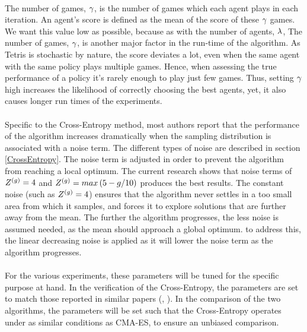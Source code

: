 \\
The number of games, $\gamma$, 
is the number of games  which each agent 
plays in each iteration. An agent's score is defined as the 
mean of the score of these 
$\gamma$ games.
We want this value low as possible, because as with the number of
agents, $\lambda$, The number of games, $\gamma$, 
is another major factor in the run-time of the algorithm.
As Tetris is stochastic by nature, the score deviates a lot, 
even when the
same agent with the same policy plays multiple games. 
Hence, when assessing the true
performance of a policy it's rarely enough to play just few games. Thus, setting 
$\gamma$ high increases the likelihood of correctly choosing the best 
agents, yet, it also causes longer run times of the experiments.\\
\\
Specific to the Cross-Entropy method, 
most authors report that the performance of the 
algorithm increases dramatically when the sampling 
distribution is associated with
a noise term. The different types of 
noise are described in section \ref{CrossEntropy}.
The noise term is adjusted in order to 
prevent the algorithm from reaching a local optimum.
The current research shows that noise terms of $Z^{(g)} = 4$ and 
$Z^{(g)} = max \left( 5 - g / 10 \right)$ 
\citep{thiery:09} produces the best results.
The constant noise (such as $Z^{(g)} = 4$) ensures that the algorithm
never settles in a too small area from which it samples, and forces it to explore
solutions that are further away from the mean. The further the 
algorithm progresses, 
the less noise is assumed needed, as the mean should approach a global optimum. to
address this, the linear decreasing noise 
is applied as it will lower the noise term
as the algorithm progresses.\\
\\
For the various experiments, these 
parameters will be tuned for the specific purpose 
at hand. In the verification of the Cross-Entropy, the parameters are set 
to match those reported in similar papers (\cite{thiery:09}, \cite{szita:06}).
In the comparison of the two algorithms, the parameters will be set such that 
the Cross-Entropy operates under as 
similar conditions as CMA-ES, to ensure an unbiased 
comparison.





